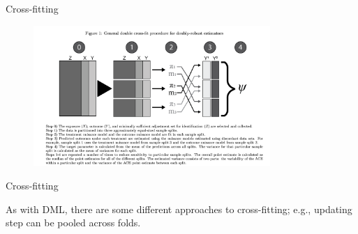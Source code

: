 \documentclass[xcolor={table}]{beamer}
\begin{document}
\note{
\scriptsize \singlespacing

}
\begin{frame}{Cross-fitting}

\begin{figure}
\centering
\includegraphics[width = 0.8\textwidth]{../assets/zivich-breskin_cv.png}
\end{figure}
\hfill \cite{zivich2021machine}
\end{frame}


\begin{frame}{Cross-fitting}

\begin{wideitemize}
\item As with DML, there are some different approaches to cross-fitting; e.g., updating step can be pooled across folds. 
\end{wideitemize}

\end{frame}


\end{document}
